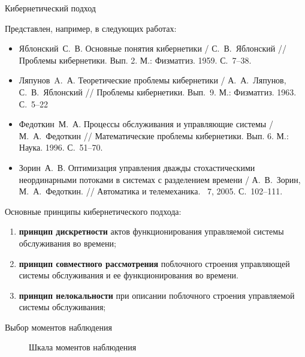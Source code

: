 \documentclass[10pt]{beamer}
\begin{document}
\begin{frame}[allowframebreaks]{Кибернетический подход}
\begin{block}{}
Представлен, например, в следующих работах:
\begin{itemize}
\item Яблонский~С.~В. Основные понятия кибернетики / С.~В.~Яблонский // Проблемы кибернетики. Вып. 2. М.: Физматгиз. 1959. С.~7--38.
  \item Ляпунов~A.~А. Теоретические проблемы кибернетики / А.~А.~Ляпунов, С.~В.~Яблонский // Проблемы кибернетики. Вып.~9. М.: Физматгиз. 1963. С.~5--22
\item Федоткин~М.~А. Процессы обслуживания и управляющие системы / М.~А.~Федоткин //  Математические проблемы кибернетики. Вып. 6. М.: Наука. 1996. С.~51--70.
\item Зорин~А.~В. Оптимизация управления дважды стохастическими неординарными потоками в системах с разделением времени / А.~В.~Зорин, М.~А.~Федоткин. // Автоматика и телемеханика. \No~7, 2005. С.~102--111.
\end{itemize}
\end{block}

\framebreak
Основные принципы кибернетического подхода:
  \begin{enumerate}
  \item \textbf{принцип дискретности} актов функционирования управляемой
    системы обслуживания во времени;
  \item \textbf{принцип совместного
    рассмотрения} поблочного строения управляющей системы
    обслуживания и ее функционирования во времени.
  \item \textbf{принцип нелокальности} при описании поблочного 
    строения управляемой системы обслуживания;
  \end{enumerate}

  \framebreak

Выбор моментов наблюдения
   \begin{figure}[h]
    \centering
    \caption{Шкала моментов наблюдения}
    \label{AZ:fig:3}
  \end{figure}

\framebreak


\end{frame}
\end{document}
